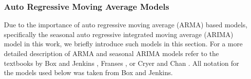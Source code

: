 \subsubsection{Auto Regressive Moving Average Models}
Due to the importance of auto regressive moving average (ARMA) based models, specifically the seasonal auto regressive integrated moving average (ARIMA) model in this work, we briefly introduce such models in this section.  For a more detailed description of ARMA and seasonal ARIMA models refer to the textbooks by Box and Jenkins \cite{Box2008}, Franses \cite{Franses1998}, or Cryer and Chan \cite{Cryer2008}.  All notation for the models used below was taken from Box and Jenkins.
%
%
%
%
%
